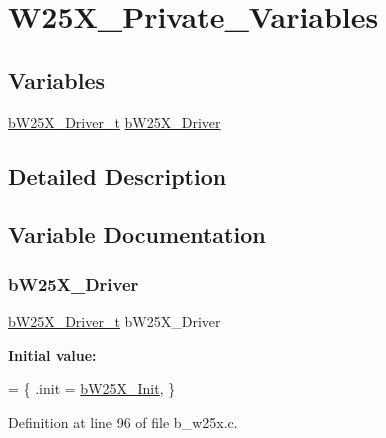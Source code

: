 \hypertarget{group___w25_x___private___variables}{}\section{W25\+X\+\_\+\+Private\+\_\+\+Variables}
\label{group___w25_x___private___variables}
\subsection*{Variables}
\begin{DoxyCompactItemize}
\item 
\mbox{\hyperlink{group___w25_x___exported___types_definitions_gadda45650bf6c5ce0216af3f25bb453dc}{b\+W25\+X\+\_\+\+Driver\+\_\+t}} \mbox{\hyperlink{group___w25_x___private___variables_gaf32f0de405f6f704a717654d70349629}{b\+W25\+X\+\_\+\+Driver}}
\end{DoxyCompactItemize}


\subsection{Detailed Description}


\subsection{Variable Documentation}
\mbox{\label{group___w25_x___private___variables_gaf32f0de405f6f704a717654d70349629}} 
\subsubsection{\texorpdfstring{b\+W25\+X\+\_\+\+Driver}{bW25X\_Driver}}
{\footnotesize\ttfamily \mbox{\hyperlink{group___w25_x___exported___types_definitions_gadda45650bf6c5ce0216af3f25bb453dc}{b\+W25\+X\+\_\+\+Driver\+\_\+t}} b\+W25\+X\+\_\+\+Driver}

{\bfseries Initial value\+:}
\begin{DoxyCode}
= 
\{
        .init = \mbox{\hyperlink{group___w25_x___exported___functions_gaf21a484dde17ecbe3be7b7ce034325e7}{bW25X\_Init}},
\}
\end{DoxyCode}


Definition at line 96 of file b\+\_\+w25x.\+c.

